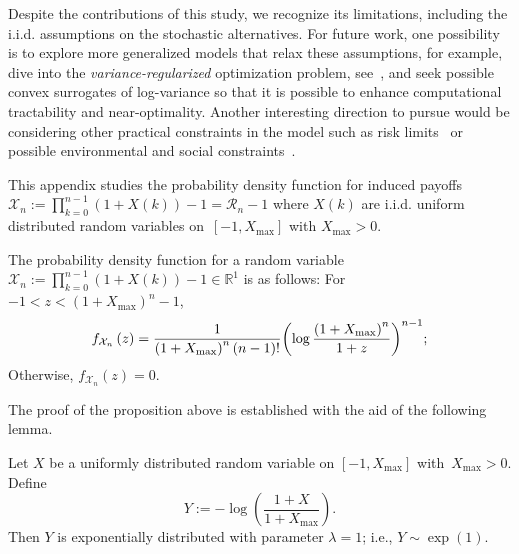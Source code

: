     Despite the contributions of this study, we recognize its limitations, including the i.i.d. assumptions on the stochastic alternatives. 
    For future work, one possibility is to explore more generalized models that relax these assumptions, for example, dive into the \textit{variance-regularized} optimization problem, see~\cite{duchi2019variance}, and seek possible convex surrogates of log-variance so that it is possible to enhance computational tractability and near-optimality.  
    Another interesting direction to pursue would be considering other practical constraints in the model such as risk limits~\cite{jorion2007value} or possible environmental and social constraints~\cite{eccles2014impact}.

 
 \appendix
\label{Induced Return:Uniform_Distribution}
This appendix studies the probability density function for induced payoffs
$\mathcal{X}_n := \prod_{k=0}^{n-1} (1+X(k)) -1 = \mathcal{R}_n - 1$
where $X(k)$ are i.i.d. uniform distributed random variables on~$[ -1, X_{\max}]$ with $X_{\max} > 0$. 


\begin{proposition} \label{proposition: Erlang compound return}
    The probability density function for a random variable $\mathcal{X}_n := \prod_{k=0}^{n-1} (1+X(k)) -1  \in \mathbb{R}^1$ is as follows: For $ - 1 < z < \left( 1 + X_{\max } \right)^n - 1$, 
\[
f_{{\cal X}_n } \left( z \right) = \frac{1}{{{{(1 + {X_{\max }})}^n}\left( {n - 1} \right)!}}{\left( {\log \frac{{{{(1 + {X_{\max }})}^n}}}{{1 + z}}} \right)^{n - 1}};
\]	
Otherwise, $f_{\mathcal{X}_n}(z)=0.$
\end{proposition}

 

 The proof of the proposition above is established with the aid of the following lemma.

\begin{lemma} \label{lemma: auxiliary lemma}
    Let $X$ be a uniformly distributed random variable on $[-1, X_{\max}]$ with~$X_{\max} >0$. Define 
	$$
	Y := - \log \left( \frac{1 + X }{1+X_{\max}} \right).
	$$ 
 Then $Y$ is exponentially distributed with parameter $\lambda=1$; i.e., $Y \sim \exp(1)$. 
\end{lemma}
 

